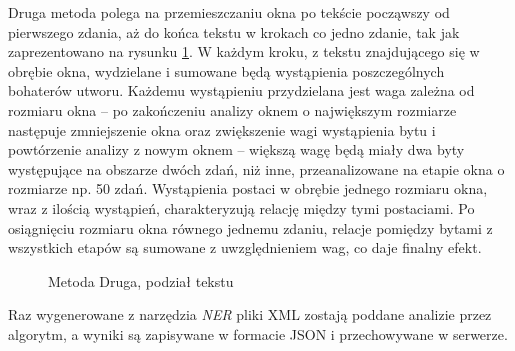 \documentclass[12pt,a4paper]{article} %
\begin{document}
        Druga metoda polega na przemieszczaniu okna po tekście począwszy od pierwszego zdania, aż do końca tekstu w krokach co jedno zdanie, tak jak zaprezentowano na rysunku \ref{fig:plyw}. W każdym kroku, z tekstu znajdującego się w obrębie okna, wydzielane i sumowane będą wystąpienia poszczególnych bohaterów utworu. Każdemu wystąpieniu przydzielana jest waga zależna od rozmiaru okna -- po zakończeniu analizy oknem o największym rozmiarze następuje zmniejszenie okna oraz zwiększenie wagi wystąpienia bytu i powtórzenie analizy z nowym oknem -- większą wagę będą miały dwa byty występujące na obszarze dwóch zdań, niż inne, przeanalizowane na etapie okna o rozmiarze np. 50 zdań. Wystąpienia postaci w obrębie jednego rozmiaru okna, wraz z ilością wystąpień, charakteryzują relację między tymi postaciami. Po osiągnięciu rozmiaru okna równego jednemu zdaniu, relacje pomiędzy bytami z wszystkich etapów są sumowane z uwzględnieniem wag, co daje finalny efekt.
        \begin{figure}[!th]
        \caption{Metoda Druga, podział tekstu}
        \label{fig:plyw}
        \centering
        \end{figure}
        
         Raz wygenerowane z narzędzia \textit{NER} pliki XML zostają poddane analizie przez algorytm, a wyniki są zapisywane w formacie JSON i przechowywane w serwerze.
        
        
\end{document}
